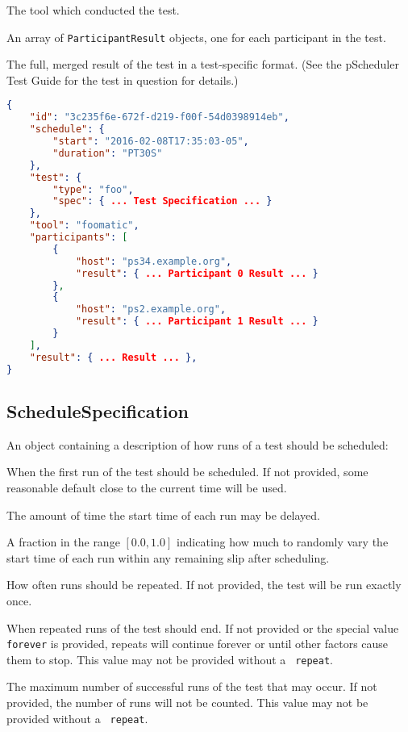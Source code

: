 \documentclass[10pt]{article}
\begin{document}
 The tool which conducted the
test.

 An array of {\tt ParticipantResult}
objects, one for each participant in the test.

 The full, merged result of the test in a
test-specific format.  (See the pScheduler Test Guide for the test in
question for details.)

\example
\begin{lstlisting}[language=json]
{
    "id": "3c235f6e-672f-d219-f00f-54d0398914eb",
    "schedule": {
        "start": "2016-02-08T17:35:03-05",
        "duration": "PT30S"
    },
    "test": {
        "type": "foo",
        "spec": { ... Test Specification ... }
    },
    "tool": "foomatic",
    "participants": [
        {
            "host": "ps34.example.org",
            "result": { ... Participant 0 Result ... }
        },
        {
            "host": "ps2.example.org",
            "result": { ... Participant 1 Result ... }
        }
    ],
    "result": { ... Result ... },
}
\end{lstlisting}


\subsection{ScheduleSpecification}
An object containing a description of how runs of a test should be scheduled:

 When the first run of the
test should be scheduled.  If not provided, some reasonable default
close to the current time will be used.

 The amount of time the start time of each
run may be delayed.

 A fraction in the range $[0.0, 1.0]$
indicating how much to randomly vary the start time of each run within
any remaining slip after scheduling.

 How often runs should be repeated.  If
not provided, the test will be run exactly once.

 When repeated runs of the
test should end.  If not provided or the special value {\tt forever}
is provided, repeats will continue forever or until other factors
cause them to stop.  This value may not be provided without a {\tt
  repeat}.

 The maximum number of successful runs
of the test that may occur.  If not provided, the number of runs will
not be counted.  This value may not be provided without a {\tt
  repeat}.
\end{document}
